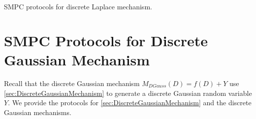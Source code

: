       \begin{protocol}[tbh!]
            \centering
            \caption{SMPC protocols for discrete Laplace mechanism.}
            \label{prot:DLapMechanism}
      \end{protocol}
      \FloatBarrier



      \section{SMPC Protocols for Discrete Gaussian Mechanism}
      \label{MPCProtocolforDiscreteGaussianMechanism}
      Recall that the discrete Gaussian mechanism $M_{DGauss}\left(D\right)=f\left(D\right)+Y$ use \autoref{sec:DiscreteGaussianMechanism} to generate a discrete Gaussian random variable $Y$.
      We provide the \smpc protocols for \autoref{sec:DiscreteGaussianMechanism} and the discrete Gaussian mechanisms.



